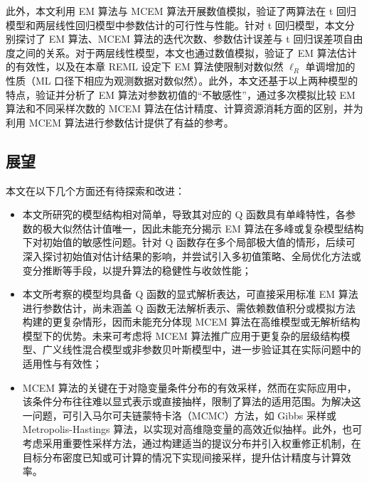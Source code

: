\documentclass[12pt,a4paper]{ctexart}
\numberwithin{figure}{section}
\numberwithin{table}{section}
\begin{document}
此外，本文利用 EM 算法与 MCEM 算法开展数值模拟，验证了两算法在 t 回归模型和两层线性回归模型中参数估计的可行性与性能。针对 t 回归模型，本文分别探讨了 EM 算法、MCEM 算法的迭代次数、参数估计误差与 t 回归误差项自由度之间的关系。对于两层线性模型，本文也通过数值模拟，验证了 EM 算法估计的有效性，以及在本章 REML 设定下 EM 算法使限制对数似然 $\ell_R$ 单调增加的性质（ML 口径下相应为观测数据对数似然）。此外，本文还基于以上两种模型的特点，验证并分析了 EM 算法对参数初值的“不敏感性”，通过多次模拟比较 EM 算法和不同采样次数的 MCEM 算法在估计精度、计算资源消耗方面的区别，并为利用 MCEM 算法进行参数估计提供了有益的参考。

\subsection{展望}

本文在以下几个方面还有待探索和改进：

\begin{itemize}
  \item 本文所研究的模型结构相对简单，导致其对应的 Q 函数具有单峰特性，各参数的极大似然估计值唯一，因此未能充分揭示 EM 算法在多峰或复杂模型结构下对初始值的敏感性问题。针对 Q 函数存在多个局部极大值的情形，后续可深入探讨初始值对估计结果的影响，并尝试引入多初值策略、全局优化方法或变分推断等手段，以提升算法的稳健性与收敛性能；
  \item 本文所考察的模型均具备 Q 函数的显式解析表达，可直接采用标准 EM 算法进行参数估计，尚未涵盖 Q 函数无法解析表示、需依赖数值积分或模拟方法构建的更复杂情形，因而未能充分体现 MCEM 算法在高维模型或无解析结构模型下的优势。未来可考虑将 MCEM 算法推广应用于更复杂的层级结构模型、广义线性混合模型或非参数贝叶斯模型中，进一步验证其在实际问题中的适用性与有效性；
  \item MCEM 算法的关键在于对隐变量条件分布的有效采样，然而在实际应用中，该条件分布往往难以显式表示或直接抽样，限制了算法的适用范围。为解决这一问题，可引入马尔可夫链蒙特卡洛（MCMC）方法，如 Gibbs 采样或 Metropolis-Hastings 算法，以实现对高维隐变量的高效近似抽样。此外，也可考虑采用重要性采样方法，通过构建适当的提议分布并引入权重修正机制，在目标分布密度已知或可计算的情况下实现间接采样，提升估计精度与计算效率。
\end{itemize}
\end{document}

